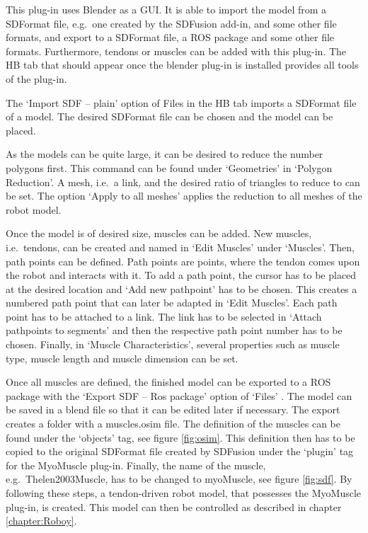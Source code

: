 This plug-in uses Blender as a GUI. It is able to import the model from a SDFormat file, e.g.\ one created by the SDFusion add-in, and some other file formats, and export to a SDFormat file, a ROS package and some other file formats. Furthermore, tendons or muscles can be added with this plug-in. The HB tab that should appear once the blender plug-in is installed provides all tools of the plug-in.%

The ‘Import SDF – plain’ option of Files in the HB tab imports a SDFormat file of a model. The desired SDFormat file can be chosen and the model can be placed. 

As the models can be quite large, it can be desired to reduce the number polygons first. This command can be found under ‘Geometries’ in ‘Polygon Reduction’. A mesh, i.e.\ a link, and the desired ratio of triangles to reduce to can be set. The option ‘Apply to all meshes’ applies the reduction to all meshes of the robot model.

Once the model is of desired size, muscles can be added. New muscles, i.e.\ tendons, can be created and named in ‘Edit Muscles’ under ‘Muscles’. Then, path points can be defined. Path points are points, where the tendon comes upon the robot and interacts with it\cite{BA}. To add a path point, the cursor has to be placed at the desired location and ‘Add new pathpoint’ has to be chosen. This creates a numbered path point that can later be adapted in ‘Edit Muscles’. Each path point has to be attached to a link. The link has to be selected in ‘Attach pathpoints to segments’ and then the respective path point number has to be chosen. Finally, in ‘Muscle Characteristics’, several properties such as muscle type, muscle length and muscle dimension can be set.

Once all muscles are defined, the finished model can be exported to a ROS package with the ‘Export SDF – Ros package’ option of ‘Files’ . The model can be saved in a blend file so that it can be edited later if necessary. The export creates a folder with a muscles.osim file. The definition of the muscles can be found under the `objects' tag, see figure \ref{fig:osim}. This definition then has to be copied to the original SDFormat file created by SDFusion under the `plugin' tag for the MyoMuscle plug-in. Finally, the name of the muscle, e.g.\ Thelen2003Muscle, has to be changed to myoMuscle, see figure \ref{fig:sdf}. By following these steps, a tendon-driven robot model, that possesses the MyoMuscle plug-in, is created. This model can then be controlled as described in chapter \ref{chapter:Roboy}.

